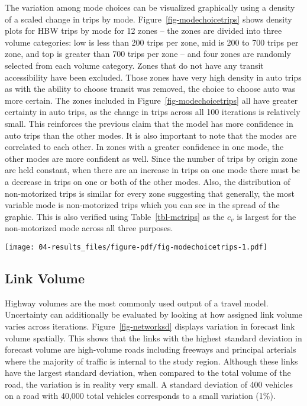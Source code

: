\documentclass[
  letterpaper,
  authoryear,
  review,
  3p]{elsarticle}
\begin{document}
The variation among mode choices can be visualized graphically using a
density of a scaled change in trips by mode.
Figure~\ref{fig-modechoicetrips} shows density plots for HBW trips by
mode for 12 zones -- the zones are divided into three volume categories:
low is less than 200 trips per zone, mid is 200 to 700 trips per zone,
and top is greater than 700 trips per zone -- and four zones are
randomly selected from each volume category. Zones that do not have any
transit accessibility have been excluded. Those zones have very high
density in auto trips as with the ability to choose transit was removed,
the choice to choose auto was more certain. The zones included in
Figure~\ref{fig-modechoicetrips} all have greater certainty in auto
trips, as the change in trips across all 100 iterations is relatively
small. This reinforces the previous claim that the model has more
confidence in auto trips than the other modes. It is also important to
note that the modes are correlated to each other. In zones with a
greater confidence in one mode, the other modes are more confident as
well. Since the number of trips by origin zone are held constant, when
there are an increase in trips on one mode there must be a decrease in
trips on one or both of the other modes. Also, the distribution of
non-motorized trips is similar for every zone suggesting that generally,
the most variable mode is non-motorized trips which you can see in the
spread of the graphic. This is also verified using
Table~\ref{tbl-mctrips} as the \(c_v\) is largest for the non-motorized
mode across all three purposes.

\begin{sidewaysfigure}

{\centering \texttt{[image: 04-results\_files/figure-pdf/fig-modechoicetrips-1.pdf]}

}

\caption{\label{fig-modechoicetrips}Trip density for coefficient of
variation by mode for HBW trips.}

\end{sidewaysfigure}

\hypertarget{link-volume}{%
\subsection{Link Volume}\label{link-volume}}

Highway volumes are the most commonly used output of a travel model.
Uncertainty can additionally be evaluated by looking at how assigned
link volume varies across iterations. Figure~\ref{fig-networksd}
displays variation in forecast link volume spatially. This shows that
the links with the highest standard deviation in forecast volume are
high-volume roads including freeways and principal arterials where the
majority of traffic is internal to the study region. Although these
links have the largest standard deviation, when compared to the total
volume of the road, the variation is in reality very small. A standard
deviation of 400 vehicles on a road with 40,000 total vehicles
corresponds to a small variation (1\%).
\end{document}
